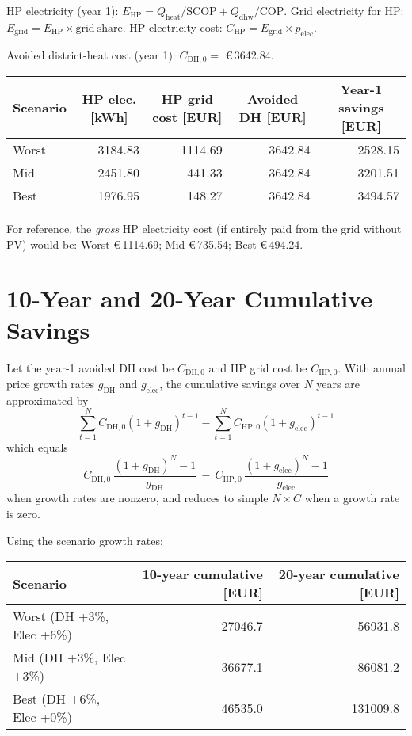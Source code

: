 \documentclass[11pt,oneside]{report}
\begin{document}
HP electricity (year 1): \(E_\mathrm{HP} = Q_\mathrm{heat}/\mathrm{SCOP} + Q_\mathrm{dhw}/\mathrm{COP}\). Grid electricity for HP: \(E_\mathrm{grid} = E_\mathrm{HP} \times \mathrm{grid\ share}\). HP electricity cost: \(C_\mathrm{HP} = E_\mathrm{grid} \times p_\mathrm{elec}\).

Avoided district-heat cost (year 1): \(C_\mathrm{DH,0} = \) \euro\,\num{3642.84}.

\begin{longtable}{@{}lrrrr@{}}
\toprule
Scenario & \multicolumn{1}{c}{HP elec. [kWh]} & \multicolumn{1}{c}{HP grid cost [EUR]} & \multicolumn{1}{c}{Avoided DH [EUR]} & \multicolumn{1}{c}{Year-1 savings [EUR]} \\
\midrule
Worst & \num{3184.83} & \num{1114.69} & \num{3642.84} & \num{2528.15} \\
Mid   & \num{2451.80} & \num{441.33}  & \num{3642.84} & \num{3201.51} \\
Best  & \num{1976.95} & \num{148.27}  & \num{3642.84} & \num{3494.57} \\
\bottomrule
\end{longtable}

For reference, the \emph{gross} HP electricity cost (if entirely paid from the grid without PV) would be: Worst \euro\,\num{1114.69}; Mid \euro\,\num{735.54}; Best \euro\,\num{494.24}.

\chapter{10-Year and 20-Year Cumulative Savings}
Let the year-1 avoided DH cost be \(C_{\mathrm{DH},0}\) and HP grid cost be \(C_{\mathrm{HP},0}\). With annual price growth rates \(g_\mathrm{DH}\) and \(g_\mathrm{elec}\), the cumulative savings over \(N\) years are approximated by
\[\sum_{t=1}^{N} C_{\mathrm{DH},0}(1+g_\mathrm{DH})^{t-1} - \sum_{t=1}^{N} C_{\mathrm{HP},0}(1+g_\mathrm{elec})^{t-1}\]
which equals
\[ C_{\mathrm{DH},0}\,\frac{(1+g_\mathrm{DH})^{N}-1}{g_\mathrm{DH}}\ -\ C_{\mathrm{HP},0}\,\frac{(1+g_\mathrm{elec})^{N}-1}{g_\mathrm{elec}}\] when growth rates are nonzero, and reduces to simple \(N\times C\) when a growth rate is zero.

Using the scenario growth rates:

\begin{longtable}{@{}lrr@{}}
\toprule
Scenario & 10-year cumulative [EUR] & 20-year cumulative [EUR] \\
\midrule
Worst (DH +3\%, Elec +6\%) & \num{27046.7} & \num{56931.8} \\
Mid   (DH +3\%, Elec +3\%) & \num{36677.1} & \num{86081.2} \\
Best  (DH +6\%, Elec +0\%) & \num{46535.0} & \num{131009.8} \\
\bottomrule
\end{longtable}
\end{document}
